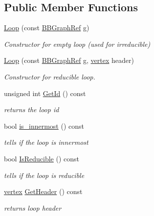 \subsection*{Public Member Functions}
\begin{DoxyCompactItemize}
\item 
\hyperlink{classLoop_aad82e65a6d90bb6b7627f5005ddcbe0e}{Loop} (const \hyperlink{basic__block_8hpp_a0e7f233d1b83cad0bfd5aa865f0d3532}{B\+B\+Graph\+Ref} \hyperlink{classLoop_a86837f1c0a1b4263e3a98a4d383a8206}{g})
\begin{DoxyCompactList}\small\item\em Constructor for empty loop (used for irreducible) \end{DoxyCompactList}\item 
\hyperlink{classLoop_aacf201b132d323e84f3035aaaf7a5662}{Loop} (const \hyperlink{basic__block_8hpp_a0e7f233d1b83cad0bfd5aa865f0d3532}{B\+B\+Graph\+Ref} \hyperlink{classLoop_a86837f1c0a1b4263e3a98a4d383a8206}{g}, \hyperlink{graph_8hpp_abefdcf0544e601805af44eca032cca14}{vertex} header)
\begin{DoxyCompactList}\small\item\em Constructor for reducible loop. \end{DoxyCompactList}\item 
unsigned int \hyperlink{classLoop_a2f959c9a7f38a30159bf6448bc093f58}{Get\+Id} () const
\begin{DoxyCompactList}\small\item\em returns the loop id \end{DoxyCompactList}\item 
bool \hyperlink{classLoop_aafb1d20818809c8c863c962ba53e2984}{is\+\_\+innermost} () const
\begin{DoxyCompactList}\small\item\em tells if the loop is innermost \end{DoxyCompactList}\item 
bool \hyperlink{classLoop_a0b2086cd13346ead18b13a3fa56558d5}{Is\+Reducible} () const
\begin{DoxyCompactList}\small\item\em tells if the loop is reducible \end{DoxyCompactList}\item 
\hyperlink{graph_8hpp_abefdcf0544e601805af44eca032cca14}{vertex} \hyperlink{classLoop_ada724b948e80a1e01ea8f69bd240d2f9}{Get\+Header} () const
\begin{DoxyCompactList}\small\item\em returns loop header \end{DoxyCompactList}\item 

\end{DoxyCompactItemize}
